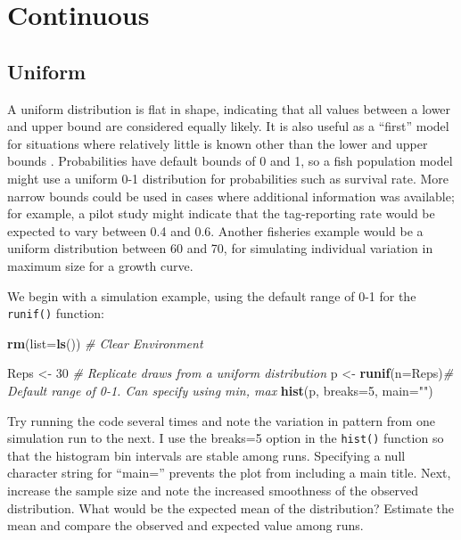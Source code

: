 \documentclass[
]{krantz}
\makeatletter
\newenvironment{Shaded}{\begin{snugshade}}{\end{snugshade}}
\newcommand{\AttributeTok}[1]{\textcolor[rgb]{0.27,0.27,0.27}{#1}}
\newcommand{\CommentTok}[1]{\textcolor[rgb]{0.37,0.37,0.37}{\textit{#1}}}
\newcommand{\DecValTok}[1]{\textcolor[rgb]{0.06,0.06,0.06}{#1}}
\newcommand{\FunctionTok}[1]{\textcolor[rgb]{0.27,0.27,0.27}{\textbf{#1}}}
\newcommand{\NormalTok}[1]{#1}
\newcommand{\OtherTok}[1]{\textcolor[rgb]{0.37,0.37,0.37}{#1}}
\newcommand{\StringTok}[1]{\textcolor[rgb]{0.5,0.5,0.5}{#1}}
\newenvironment{kframe}{%
\medskip{}
\setlength{\fboxsep}{.8em}
 \def\at@end@of@kframe{}%
 \ifinner\ifhmode%
  \def\at@end@of@kframe{\end{minipage}}%
  \begin{minipage}{\columnwidth}%
 \fi\fi%
 \def\FrameCommand##1{\hskip\@totalleftmargin \hskip-\fboxsep
 \colorbox{shadecolor}{##1}\hskip-\fboxsep
     \hskip-\linewidth \hskip-\@totalleftmargin \hskip\columnwidth}%
 \MakeFramed {\advance\hsize-\width
   \@totalleftmargin\z@ \linewidth\hsize
   \@setminipage}}%
 {\par\unskip\endMakeFramed%
 \at@end@of@kframe}
\renewenvironment{Shaded}{\begin{kframe}}{\end{kframe}}
\makeatother
\begin{document}
\hypertarget{Continuous}{%
\section{Continuous}\label{Continuous}}

\hypertarget{Uniform}{%
\subsection{Uniform}\label{Uniform}}

A uniform distribution is flat in shape, indicating that all values between a lower and upper bound are considered equally likely. It is also useful as a ``first'' model for situations where relatively little is known other than the lower and upper bounds \citep{law.kelton_1982}. Probabilities have default bounds of 0 and 1, so a fish population model might use a uniform 0-1 distribution for probabilities such as survival rate. More narrow bounds could be used in cases where additional information was available; for example, a pilot study might indicate that the tag-reporting rate would be expected to vary between 0.4 and 0.6. Another fisheries example would be a uniform distribution between 60 and 70, for simulating individual variation in maximum size for a growth curve.

We begin with a simulation example, using the default range of 0-1 for the \texttt{runif()} function:

\begin{Shaded}
\begin{Highlighting}[]
\FunctionTok{rm}\NormalTok{(}\AttributeTok{list=}\FunctionTok{ls}\NormalTok{()) }\CommentTok{\# Clear Environment}

\NormalTok{Reps }\OtherTok{\textless{}{-}} \DecValTok{30} \CommentTok{\# Replicate draws from a uniform distribution}
\NormalTok{p }\OtherTok{\textless{}{-}} \FunctionTok{runif}\NormalTok{(}\AttributeTok{n=}\NormalTok{Reps)}\CommentTok{\# Default range of 0{-}1. Can specify using min, max}
\FunctionTok{hist}\NormalTok{(p, }\AttributeTok{breaks=}\DecValTok{5}\NormalTok{, }\AttributeTok{main=}\StringTok{""}\NormalTok{)}
\end{Highlighting}
\end{Shaded}

Try running the code several times and note the variation in pattern from one simulation run to the next. I use the breaks=5 option in the \texttt{hist()} function so that the histogram bin intervals are stable among runs. Specifying a null character string for ``main='' prevents the plot from including a main title. Next, increase the sample size and note the increased smoothness of the observed distribution. What would be the expected mean of the distribution? Estimate the mean and compare the observed and expected value among runs.
\end{document}
